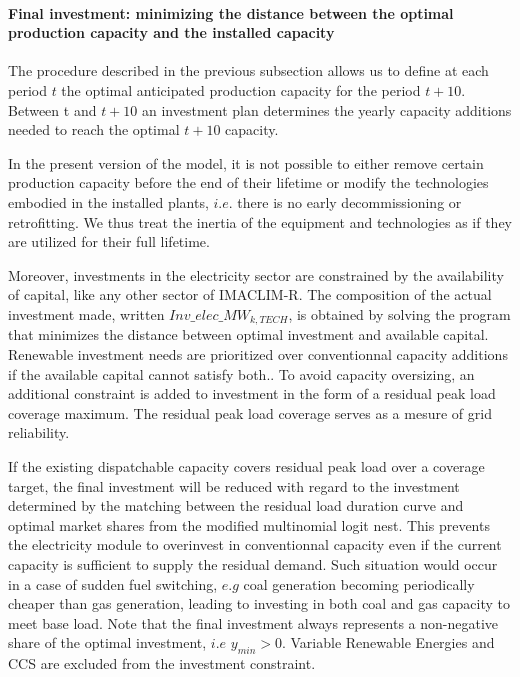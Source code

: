 

\paragraph{Final investment: minimizing the distance between the optimal production capacity and the installed capacity}

The procedure described in the previous subsection allows us to define at each period $t$  the optimal anticipated production capacity for the period $t+10$. Between t and $t+10$ an investment plan determines the yearly capacity additions needed to reach the optimal $t+10$ capacity.

In the present version of the model, it is not possible to either remove certain production capacity before the end of their lifetime or modify the technologies embodied in the installed plants, $i.e.$ there is no early decommissioning or retrofitting. We thus treat the inertia of the equipment and technologies as if they are utilized for their full lifetime.

Moreover, investments in the electricity sector are constrained by the availability of capital, like any other sector of IMACLIM-R. The composition of the actual investment made, written $Inv\_elec\_MW_{k,TECH}$, is obtained by solving the program that minimizes the distance between optimal investment and available capital. Renewable investment needs are prioritized over conventionnal capacity additions if the available capital cannot satisfy both..
To avoid capacity oversizing, an additional constraint is added to investment in the form of a residual peak load coverage maximum. The residual peak load coverage serves as a mesure of grid reliability.


If the existing dispatchable capacity covers residual peak load over a coverage target, the final investment will be reduced with regard to the investment determined by the matching between the residual load duration curve and optimal market shares from the modified multinomial logit nest. This prevents the electricity module to overinvest in conventionnal capacity even if the current capacity is sufficient to supply the residual demand. Such situation would occur in a case of sudden fuel switching, $e.g$ coal generation becoming periodically cheaper than gas generation, leading to investing in both coal and gas capacity to meet base load. Note that the final investment always represents a non-negative share of the optimal investment, $i.e$ $y_{min} > 0$. Variable Renewable Energies and CCS are excluded from the investment constraint.

